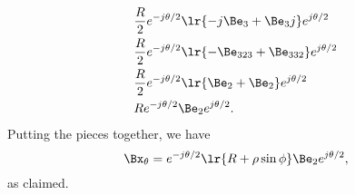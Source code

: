 {\begin{equation}
\begin{aligned}
& \frac{R}{2} e^{-j \theta/2} \lr{ -j \Be_3  + \Be_3 j } e^{ j\theta/2 } \\
& \frac{R}{2} e^{-j \theta/2} \lr{ -\Be_{323}  + \Be_{332} } e^{ j\theta/2 } \\
& \frac{R}{2} e^{-j \theta/2} \lr{ \Be_{2}  + \Be_{2} } e^{ j\theta/2 } \\
&       R     e^{-j \theta/2} \Be_{2}  e^{ j\theta/2 }.
\end{aligned}
\end{equation}
Putting the pieces together, we have
\begin{equation}\label{eqn:toriodal:81}
\Bx_\theta = e^{-j \theta/2} \lr{ R + \rho \sin\phi } \Be_{2}  e^{ j\theta/2 },
\end{equation}
as claimed.
} %
